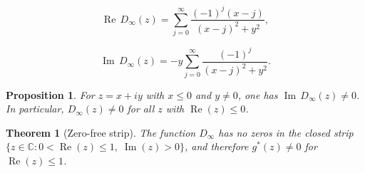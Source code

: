 \documentclass[10pt,a4paper]{amsart}
\newtheorem{proposition}{Proposition}
\newtheorem{theorem}{Theorem}
\newcommand{\Imag}{\operatorname{Im}}
\newcommand{\Real}{\operatorname{Re}}
\begin{document}
\begin{equation}\label{eq:real_part}
\Real\, D_\infty(z) = \sum_{j=0}^{\infty} \frac{(-1)^j(x-j)}{(x-j)^2 + y^2},
\end{equation}

\begin{equation}\label{eq:imag_part}
\Imag\, D_\infty(z) = -y \sum_{j=0}^{\infty} \frac{(-1)^j}{(x-j)^2 + y^2}.
\end{equation}

\begin{proposition}\label{prop:zerofree_left}
For $z = x + iy$ with $x \leq 0$ and $y \neq 0$, one has $\Imag\, D_\infty(z) \neq 0$. In particular, $D_\infty(z) \neq 0$ for all $z$ with $\Real(z) \leq 0$.
\end{proposition}

\begin{theorem}[Zero-free strip]\label{thm:zerofree}
The function $D_\infty$ has no zeros in the closed strip $\{z \in \mathbb{C} : 0 < \Real(z) \leq 1,\; \Imag(z) > 0\}$, and therefore $g^*(z) \neq 0$ for $\Real(z) \leq 1$.
\end{theorem}
\end{document}
